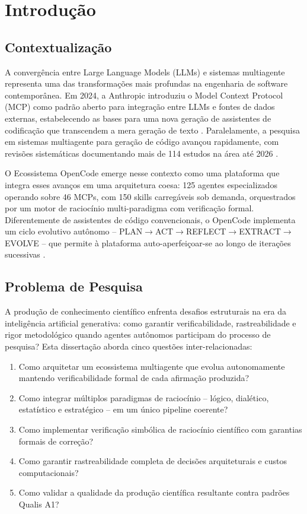 \documentclass[12pt,a4paper,sumario=tradicional]{abntex2}
\begin{document}
\chapter{Introdução}

\section{Contextualização}

A convergência entre Large Language Models (LLMs) e sistemas multiagente representa uma das transformações mais profundas na engenharia de software contemporânea. Em 2024, a Anthropic introduziu o Model Context Protocol (MCP) como padrão aberto para integração entre LLMs e fontes de dados externas, estabelecendo as bases para uma nova geração de assistentes de codificação que transcendem a mera geração de texto \cite{ayyagari2025mcp}. Paralelamente, a pesquisa em sistemas multiagente para geração de código avançou rapidamente, com revisões sistemáticas documentando mais de 114 estudos na área até 2026 \cite{rasheed2026llm}.

O Ecossistema OpenCode emerge nesse contexto como uma plataforma que integra esses avanços em uma arquitetura coesa: 125 agentes especializados operando sobre 46 MCPs, com 150 skills carregáveis sob demanda, orquestrados por um motor de raciocínio multi-paradigma com verificação formal. Diferentemente de assistentes de código convencionais, o OpenCode implementa um ciclo evolutivo autônomo -- PLAN$\rightarrow$ACT$\rightarrow$REFLECT$\rightarrow$EXTRACT$\rightarrow$EVOLVE -- que permite à plataforma auto-aperfeiçoar-se ao longo de iterações sucessivas \cite{kodumagulla2026engineering}.

\section{Problema de Pesquisa}

A produção de conhecimento científico enfrenta desafios estruturais na era da inteligência artificial generativa: como garantir verificabilidade, rastreabilidade e rigor metodológico quando agentes autônomos participam do processo de pesquisa? Esta dissertação aborda cinco questões inter-relacionadas:

\begin{enumerate}
    \item Como arquitetar um ecossistema multiagente que evolua autonomamente mantendo verificabilidade formal de cada afirmação produzida?
    \item Como integrar múltiplos paradigmas de raciocínio -- lógico, dialético, estatístico e estratégico -- em um único pipeline coerente?
    \item Como implementar verificação simbólica de raciocínio científico com garantias formais de correção?
    \item Como garantir rastreabilidade completa de decisões arquiteturais e custos computacionais?
    \item Como validar a qualidade da produção científica resultante contra padrões Qualis A1?
\end{enumerate}
\end{document}
